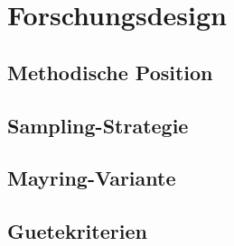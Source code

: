 \chapter{Forschungsdesign}\label{chap:design}

\section{Methodische Position}\label{sec:position}

\section{Sampling-Strategie}\label{sec:sampling}

\section{Mayring-Variante}\label{sec:variante}

\section{Guetekriterien}\label{sec:guete}
